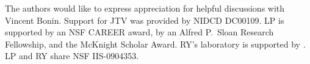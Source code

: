 The authors would like to express appreciation for helpful discussions with Vincent Bonin.  Support for JTV was provided by NIDCD DC00109. LP is supported by an NSF CAREER award, by an Alfred P.\ Sloan Research Fellowship, and the McKnight Scholar Award. RY's laboratory is supported by .  LP and RY share NSF IIS-0904353.

\appendix

\clearpage

%
%

%

% 


